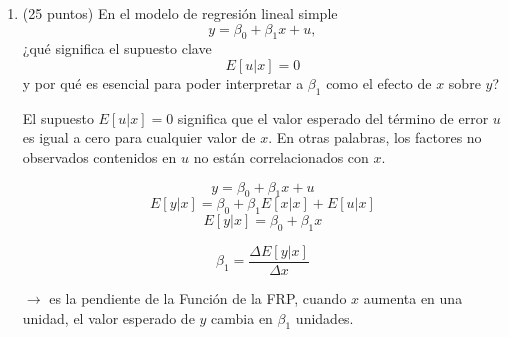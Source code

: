 \documentclass[10pt,a4paper]{article}
\begin{document}
\begin{enumerate}
{\begin{enumerate}
    \item \textbf{Razones por las que en economía se trabaja mayoritariamente con datos observacionales (5 pts)}  
    \begin{itemize}
        \item \textbf{Costo}: los experimentos son extremadamente caros.  
        \item \textbf{Ética}: no siempre es posible asignar tratamientos de forma aleatoria (ej. acceso a educación, salud).  
        \item \textbf{Disponibilidad}: existen grandes bases de datos administrativos, encuestas y registros que permiten estudiar fenómenos económicos.  
        \item \textbf{Alcance}: permiten analizar contextos amplios y reales, aunque se requiera mayor esfuerzo metodológico para aislar efectos causales.
    \end{itemize}
\end{enumerate}

}

\item (25 puntos) En el modelo de regresión lineal simple
\[
y = \beta_0 + \beta_1 x + u,
\]
¿qué significa el supuesto clave 
\[
E[u|x] = 0
\]
y por qué es esencial para poder interpretar a $\beta_1$ como el efecto de $x$ sobre $y$?


{\color{blue} El supuesto $E[u|x]=0$ significa que el valor esperado del término de error $u$ 
 es igual a cero para cualquier valor de $x$. En otras palabras, los factores no observados 
 contenidos en $u$ no están correlacionados con $x$.


 \begin{equation*}
    y = \beta_0 + \beta_1x + u
  \end{equation*}
  \begin{equation*}
    E[y|x] = \beta_0 + \beta_1E[x|x] + E[u|x]
  \end{equation*}
  \begin{equation*}
    E[y|x] = \beta_0 + \beta_1x
  \end{equation*}

\begin{equation*}
  \beta_1 = \frac{\Delta E[y|x]}{\Delta x}
\end{equation*}

$\rightarrow$ es la pendiente de la Función de la FRP, cuando \(x\) aumenta en una unidad, el valor esperado de \(y\) cambia en \(\beta_1\) unidades.

  
}



\end{enumerate}
\end{document}
